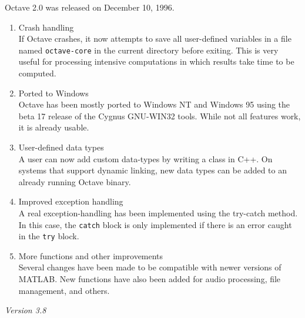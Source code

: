 \documentclass{article}
\begin{document}
\par
Octave 2.0 was released on December 10, 1996.
\begin{enumerate}

    \item Crash handling\\
    If Octave crashes, it now attempts to save all user-defined variables in a file named \texttt{octave-core} in the current directory before exiting. This is very useful for processing intensive computations in which results take time to be computed.

    \item Ported to Windows\\
    Octave has been mostly ported to Windows NT and Windows 95 using the beta 17 release of the Cygnus GNU-WIN32 tools. While not all features work, it is already usable.

    \item User-defined data types\\
    A user can now add custom data-types by writing a class in C++. On systems that support dynamic linking, new data types can be added to an already running Octave binary.

    \item Improved exception handling\\
    A real exception-handling has been implemented using the try-catch method. In this case, the \texttt{catch} block is only implemented if there is an error caught in the \texttt{try} block.

    \item More functions and other improvements\\
    Several changes have been made to be compatible with newer versions of MATLAB. New functions have also been added for audio processing, file management, and others.

\end{enumerate}

\par
\noindent
\textit{Version 3.8}
\end{document}
